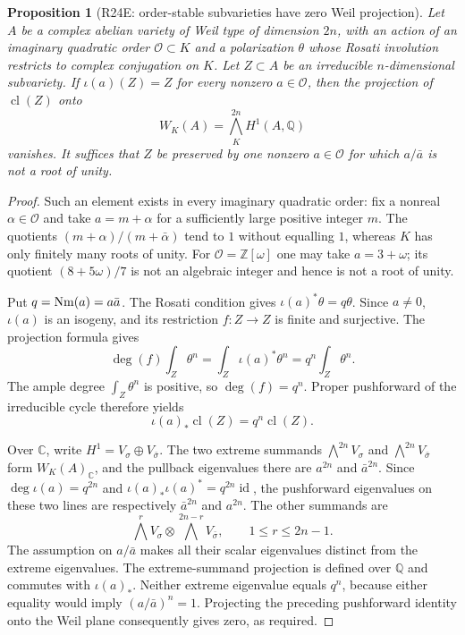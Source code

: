 \documentclass[11pt,a4paper]{article}
\newtheorem{proposition}[theorem]{Proposition}
\theoremstyle{definition}\newtheorem{definition}[theorem]{Definition}
\theoremstyle{remark}\newtheorem{remark}[theorem]{Remark}
\newcommand{\Q}{\mathbb Q}\newcommand{\Z}{\mathbb Z}\newcommand{\C}{\mathbb C}\newcommand{\R}{\mathbb R}
\newcommand{\cO}{\mathcal O}\newcommand{\CH}{\operatorname{CH}}\newcommand{\cl}{\operatorname{cl}}
\newcommand{\id}{\operatorname{id}}\newcommand{\Span}{\operatorname{span}}\newcommand{\cW}{\mathcal W}
\begin{document}
\begin{proposition}[R24E: order-stable subvarieties have zero Weil projection]\label{R24E}
Let $A$ be a complex abelian variety of Weil type of dimension $2n$, with an action of an imaginary quadratic order $\cO\subset K$ and a polarization $\theta$ whose Rosati involution restricts to complex conjugation on $K$. Let $Z\subset A$ be an irreducible $n$-dimensional subvariety. If $\iota(a)(Z)=Z$ for every nonzero $a\in\cO$, then the projection of $\cl(Z)$ onto
\[
 W_K(A)=\bigwedge_K^{2n}H^1(A,\Q)
\]
vanishes. It suffices that $Z$ be preserved by one nonzero $a\in\cO$ for which $a/\bar a$ is not a root of unity.
\end{proposition}
\begin{proof}
Such an element exists in every imaginary quadratic order: fix a nonreal $\alpha\in\cO$ and take $a=m+\alpha$ for a sufficiently large positive integer $m$. The quotients $(m+\alpha)/(m+\bar\alpha)$ tend to $1$ without equalling $1$, whereas $K$ has only finitely many roots of unity. For $\cO=\Z[\omega]$ one may take $a=3+\omega$; its quotient $(8+5\omega)/7$ is not an algebraic integer and hence is not a root of unity.

Put $q=\operatorname{Nm}(a)=a\bar a$. The Rosati condition gives $\iota(a)^*\theta=q\theta$. Since $a\ne0$, $\iota(a)$ is an isogeny, and its restriction $f:Z\to Z$ is finite and surjective. The projection formula gives
\[
 \deg(f)\int_Z\theta^n
 =\int_Z\iota(a)^*\theta^n
 =q^n\int_Z\theta^n.
\]
The ample degree $\int_Z\theta^n$ is positive, so $\deg(f)=q^n$. Proper pushforward of the irreducible cycle therefore yields
\[
 \iota(a)_*\cl(Z)=q^n\cl(Z).
\]

Over $\C$, write $H^1=V_\sigma\oplus V_{\bar\sigma}$. The two extreme summands $\bigwedge^{2n}V_\sigma$ and $\bigwedge^{2n}V_{\bar\sigma}$ form $W_K(A)_\C$, and the pullback eigenvalues there are $a^{2n}$ and $\bar a^{2n}$. Since $\deg\iota(a)=q^{2n}$ and $\iota(a)_*\iota(a)^*=q^{2n}\id$, the pushforward eigenvalues on these two lines are respectively $\bar a^{2n}$ and $a^{2n}$. The other summands are
\[
 \bigwedge^rV_\sigma\otimes\bigwedge^{2n-r}V_{\bar\sigma},\qquad 1\le r\le2n-1.
\]
The assumption on $a/\bar a$ makes all their scalar eigenvalues distinct from the extreme eigenvalues. The extreme-summand projection is defined over $\Q$ and commutes with $\iota(a)_*$. Neither extreme eigenvalue equals $q^n$, because either equality would imply $(a/\bar a)^n=1$. Projecting the preceding pushforward identity onto the Weil plane consequently gives zero, as required.
\end{proof}
\end{document}
